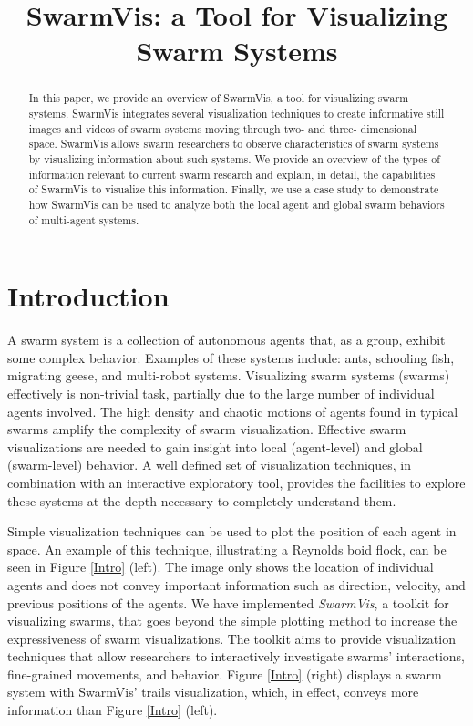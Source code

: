 \documentclass[conference]{IEEEtran}
\begin{document}
\title{SwarmVis: a Tool for Visualizing Swarm Systems}

\author{
\and
{}
}
\maketitle


\begin{abstract}
In this paper, we provide an overview of SwarmVis, a tool for
visualizing swarm systems. SwarmVis integrates several visualization
techniques to create informative still images and videos of swarm
systems moving through two- and three- dimensional space. SwarmVis
allows swarm researchers to observe characteristics of swarm systems by
visualizing information about such systems. We provide an overview of
the types of information relevant to current swarm research and explain,
in detail, the capabilities of SwarmVis to visualize this information.
Finally, we use a case study to
demonstrate how SwarmVis can be used to analyze both the local agent and
global swarm behaviors of multi-agent systems.

\end{abstract}

\section{Introduction}
A swarm system is a collection of autonomous agents that, as a group, exhibit some complex behavior.
Examples of these systems include: ants\cite{couzin2003sol}, schooling fish\cite{parrish2002sof}, migrating geese\cite{reynolds1987}, 
and multi-robot systems\cite{mondada2004sbn}\cite{mclurkin2004srt}.
Visualizing swarm systems (swarms) effectively is non-trivial task, partially due to the large number of individual agents involved.
The high density and chaotic motions of agents found in typical swarms amplify the complexity of swarm visualization.
Effective swarm visualizations are needed to gain insight into local (agent-level) and global (swarm-level) behavior.
A well defined set of visualization techniques, in combination with an interactive exploratory tool,
provides the facilities to explore these systems at the depth necessary to completely understand them.


Simple visualization techniques can be used to plot the position of each agent in space.
An example of this technique, illustrating a Reynolds boid flock\cite{reynolds1987}, can be seen in Figure \ref{Intro} (left).
The image only shows the location of individual agents and does not convey important
information such as direction, velocity, and previous positions of the agents.
We have implemented \textit{SwarmVis}, a toolkit for visualizing swarms,
that goes beyond the simple plotting method to increase the
expressiveness of swarm visualizations.
The toolkit aims to provide visualization techniques that allow researchers to interactively
investigate swarms'  interactions, fine-grained movements, and behavior.
Figure \ref{Intro} (right) displays a swarm system with SwarmVis' trails visualization, which, in effect,
conveys more information than Figure \ref{Intro} (left).
\end{document}
